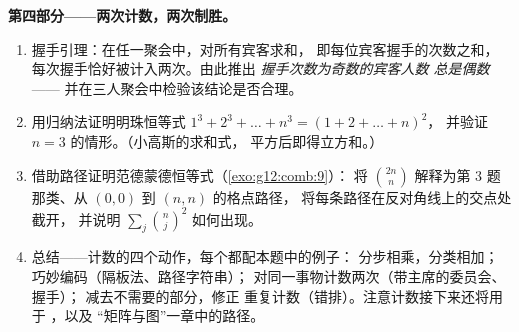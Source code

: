 \begin{problem}
\medskip
\noindent\textbf{第四部分——两次计数，两次制胜。}
\begin{enumerate}[resume]
  \item 握手引理：在任一聚会中，对所有宾客求和，
        即每位宾客握手的次数之和，每次握手恰好被计入两次。由此推出
        \emph{握手次数为奇数的宾客人数
        总是偶数}——
        并在三人聚会中检验该结论是否合理。
  \item 用归纳法证明明珠恒等式
        $1^3 + 2^3 + \dots + n^3 = (1 + 2 + \dots + n)^2$，
        并验证 $n = 3$ 的情形。（小高斯的求和式，
        平方后即得立方和。）
  \item 借助路径证明范德蒙德恒等式（\cref{exo:g12:comb:9}）：
        将 $\binom{2n}{n}$ 解释为第 3 题那类、从 $(0,0)$ 到 $(n,n)$ 的格点路径，
        将每条路径在反对角线上的交点处截开，
        并说明
        $\sum_j \binom nj^2$ 如何出现。
  \item 总结——计数的四个动作，每个都配本题中的例子：
        分步相乘，分类相加；
        巧妙编码（隔板法、路径字符串）；
        对同一事物计数两次（带主席的委员会、握手）；
        减去不需要的部分，修正
        重复计数（错排）。注意计数接下来还将用于
        ，以及
        “矩阵与图”一章中的路径。
\end{enumerate}
\end{problem}
